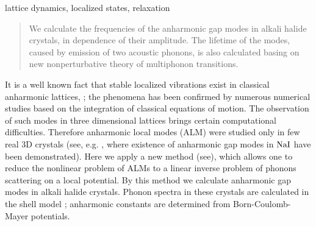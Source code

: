 \documentclass{kapproc}
\begin{document}
\newcommand{\lesssim}{\mbox{\raisebox{-0.6ex}{$\,
    \stackrel{<}{\scriptstyle\sim}\,$}}}
\newcommand{\gtrsim}{\mbox{\raisebox{-0.6ex}{$\,
    \stackrel{>}{\scriptstyle\sim}\,$}}}


\author{D.Nevedrov}

\author{V.Hizhnyakov}

\author{A.J.Sievers}

\begin{keywords}
lattice dynamics, localized states, relaxation
\end{keywords}





\begin{abstract}


We calculate the frequencies of the anharmonic gap modes in alkali
halide crystals, in dependence of their
amplitude. The lifetime of the modes, caused by
emission of two acoustic phonons, is also calculated basing on new
nonperturbative theory of multiphonon transitions.

\end{abstract}




It is a well known fact that stable localized vibrations exist in classical
anharmonic lattices, \cite{dolgov,sivtak,flach}; the
phenomena has been confirmed by numerous numerical studies based on the
integration of classical equations of motion. The observation of such modes
in three dimensional lattices brings certain computational difficulties.
Therefore anharmonic local modes (ALM) were studied only in few real 3D
crystals (see, e.g. \cite{kisgap}, where existence of anharmonic gap
modes  in ${\rm NaI}$ have been demonstrated).
Here we apply a new method (see\cite{electronic}), which
allows one to reduce the nonlinear problem of ALMs to
a linear inverse problem of phonons scattering on a
local potential. By this method
we calculate anharmonic gap modes in alkali halide
crystals. Phonon spectra in these crystals are
calculated in the shell model \cite{bilz};
anharmonic constants are determined from Born-Coulomb-Mayer potentials.
\end{document}
